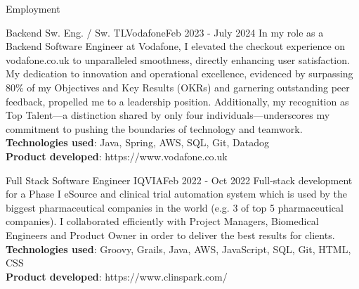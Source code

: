 \documentclass[]{mcdowellcv}
\begin{document}
  \begin{cvsection}{Employment}
		\begin{cvsubsection}{Backend Sw. Eng. / Sw. TL}{Vodafone}{Feb 2023 - July 2024}
			\hspace{\parindent} \hspace{\parindent} \hspace{\parindent} \hspace{\parindent} 
			    In my role as a Backend Software Engineer at Vodafone, I elevated the checkout experience on vodafone.co.uk to unparalleled smoothness, directly enhancing user satisfaction. My dedication to innovation and operational excellence, evidenced by surpassing 80\% of my Objectives and Key Results (OKRs) and garnering outstanding peer feedback, propelled me to a leadership position. Additionally, my recognition as Top Talent—a distinction shared by only four individuals—underscores my commitment to pushing the boundaries of technology and teamwork.
			\\ \textbf{Technologies used}: Java, Spring, AWS, SQL, Git, Datadog
			\\ \textbf{Product developed}: https://www.vodafone.co.uk
		\end{cvsubsection}

	    \begin{cvsubsection}{Full Stack Software Engineer }{IQVIA}{Feb 2022 - Oct 2022}
			\hspace{\parindent} \hspace{\parindent} \hspace{\parindent} \hspace{\parindent} Full-stack development for a Phase I eSource and clinical trial automation system which is used by the biggest pharmaceutical companies in the world (e.g. 3 of top 5 pharmaceutical companies). I collaborated efficiently with Project Managers, Biomedical Engineers and Product Owner in order to deliver the best results for clients. 
			\\ \textbf{Technologies used}: Groovy, Grails, Java, AWS, JavaScript, SQL, Git, HTML, CSS
			\\ \textbf{Product developed}: https://www.clinspark.com/
		\end{cvsubsection}


\end{cvsection}
\end{document}
